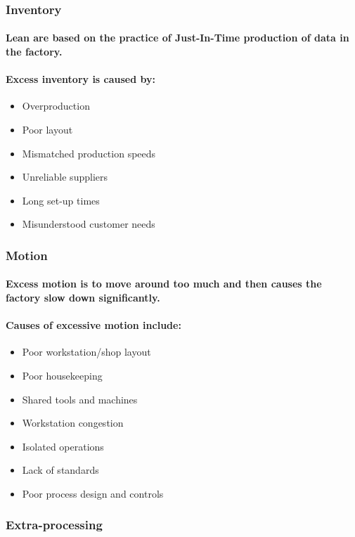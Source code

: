 \documentclass{acm_proc_article-sp}
\begin{document}
\subsubsection{Inventory}
\paragraph{Lean are based on the practice of Just-In-Time production of data in the factory.}
\paragraph{Excess inventory is caused by:}
\begin{itemize}
\item Overproduction
\item Poor layout
\item Mismatched production speeds
\item Unreliable suppliers
\item Long set-up times
\item Misunderstood customer needs
\end{itemize}
\subsubsection{Motion}
\paragraph{Excess motion is to move around too much and then causes the factory slow down significantly.}
\paragraph{Causes of excessive motion include:}
\begin{itemize}
\item Poor workstation/shop layout
\item Poor housekeeping
\item Shared tools and machines
\item Workstation congestion
\item Isolated operations
\item Lack of standards
\item Poor process design and controls
\end{itemize}
\subsubsection{Extra-processing}
\end{document}
